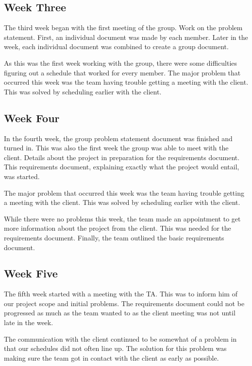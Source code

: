 \documentclass[onecolumn, draftclsnofoot,10pt, compsoc]{IEEEtran}
\begin{document}
\subsection{Week Three}
The third week began with the first meeting of the group.
Work on the problem statement.
First, an individual document was made by each member.
Later in the week, each individual document was combined to create a group document.
\par
As this was the first week working with the group, there were some difficulties figuring out a schedule that worked for every member.
The major problem that occurred this week was the team having trouble getting a meeting with the client.
This was solved by scheduling earlier with the client.\par

\subsection{Week Four}
In the fourth week, the group problem statement document was finished and turned in.
This was also the first week the group was able to meet with the client.
Details about the project in preparation for the requirements document.
This requirements document, explaining exactly what the project would entail, was started.\par
The major problem that occurred this week was the team having trouble getting a meeting with the client.
This was solved by scheduling earlier with the client.\par
While there were no problems this week, the team made an appointment to get more information about the project from the client.
This was needed for the requirements document.
Finally, the team outlined the basic requirements document.\par

\subsection{Week Five}
The fifth week started with a meeting with the TA.
This was to inform him of our project scope and initial problems.
The requirements document could not be progressed as much as the team wanted to as the client meeting was not until late in the week.\par
The communication with the client continued to be somewhat of a problem in that our schedules did not often line up.
The solution for this problem was making sure the team got in contact with the client as early as possible.\par
\end{document}
